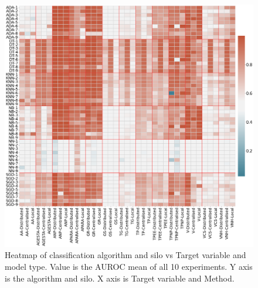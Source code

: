 



\begin{figure}[htbp]
\centering
\captionsetup{justification=centering}

\caption{Heatmap of classification algorithm and silo vs Target variable and model type. Value is the AUROC mean of all 10 experiments. Y axis is the algorithm and silo. X axis is Target variable and Method.}\label{fig:heatmap-cat} 
\includegraphics[scale=0.26]{figures/heatmap-class.png}
\end{figure}


